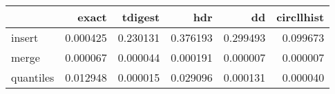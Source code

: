 \begin{tabular}{lrrrrr}
\toprule
{} &     exact &   tdigest &       hdr &        dd &  circllhist \\
\midrule
insert    &  0.000425 &  0.230131 &  0.376193 &  0.299493 &    0.099673 \\
merge     &  0.000067 &  0.000044 &  0.000191 &  0.000007 &    0.000007 \\
quantiles &  0.012948 &  0.000015 &  0.029096 &  0.000131 &    0.000040 \\
\bottomrule
\end{tabular}
